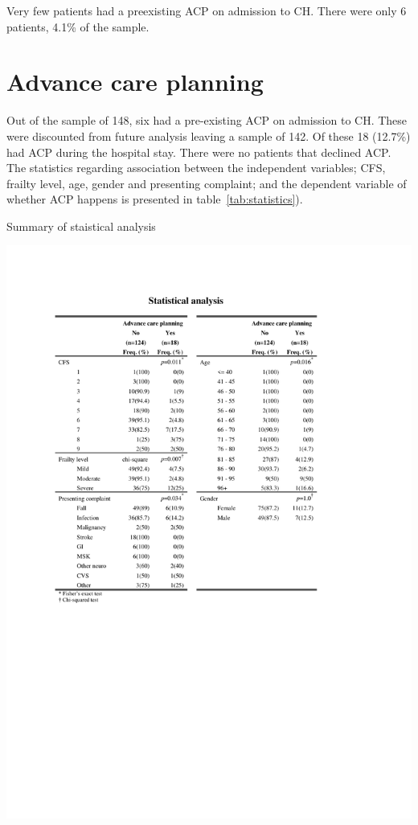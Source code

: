 \documentclass
[
	12pt,
	a4paper,
	oneside,
]{report}
\begin{document}
Very few patients had a preexisting ACP on admission to CH. There were only 6
patients, 4.1\% of the sample.


\section{Advance care planning}

Out of the sample of 148, six had a pre-existing ACP on admission to CH. These 
were discounted from future analysis leaving a sample of 142. Of these 18 
(12.7\%) had ACP during the hospital stay. There were no patients that 
declined ACP. The statistics regarding association between the independent 
variables; CFS, frailty level, age, gender and presenting complaint; and the 
dependent variable of whether ACP happens is presented in 
table~\ref{tab:statistics}).

\begin{table}[ht]
\caption{Summary of staistical analysis}
\label{tab:statistics}
\includegraphics[width=\textwidth,
	trim={2.5cm 10cm 2.5cm 2.5cm},
	clip]{media/statistical-analysis}
\end{table}
\end{document}
